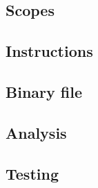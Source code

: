 \subsection{Scopes}

\subsection{Instructions}
\label{sec:implementation:instr}


\subsection{Binary file}

\subsection{Analysis}

\subsection{Testing}









